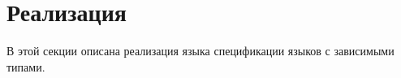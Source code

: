 \section{Реализация}
В этой секции описана реализация языка спецификации языков с зависимыми типами.












